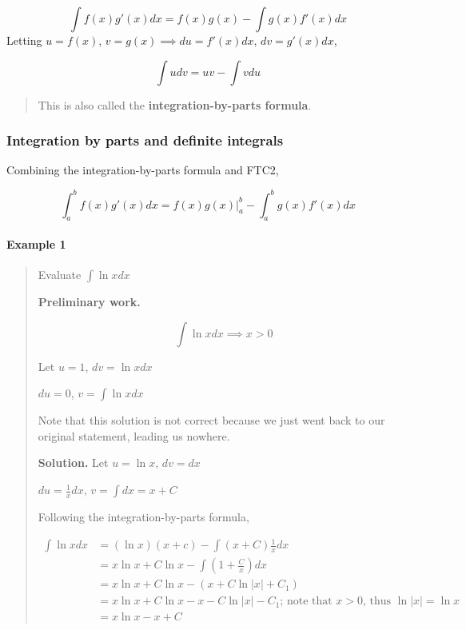 \documentclass[
]{article}
\begin{document}
\[ \int f(x)g'(x)dx = f(x)g(x) - \int g(x)f'(x)dx \] Letting
\(u = f(x)\), \(v=g(x) \implies du = f'(x)dx\), \(dv = g'(x)dx\),

\[ \int udv = uv - \int vdu \]

\begin{quote}
This is also called the \textbf{integration-by-parts formula}.
\end{quote}

\hypertarget{integration-by-parts-and-definite-integrals}{%
\subsubsection{Integration by parts and definite
integrals}\label{integration-by-parts-and-definite-integrals}}

Combining the integration-by-parts formula and FTC2,

\[ \int_a^b f(x)g'(x)dx = f(x)g(x) \Big|_a^b - \int_a^b g(x)f'(x)dx \]

\hypertarget{example-1-5}{%
\paragraph*{Example 1}\label{example-1-5}}

\begin{quote}
Evaluate \(\displaystyle\int \ln x dx\)

\textbf{Preliminary work.}

\[ \int \ln x dx \implies x > 0 \]

Let \(u = 1\), \(dv = \ln x dx\)

\(du = 0\), \(v = \int \ln x dx\)

Note that this solution is not correct because we just went back to our
original statement, leading us nowhere.

\textbf{Solution.} Let \(u = \ln x\), \(dv = dx\)

\(du = \frac{1}{x}dx\), \(v = \int dx = x + C\)

Following the integration-by-parts formula,

\begin{align*}
\int \ln x dx &= (\ln x)(x+c) - \int (x+C)\frac{1}{x} dx\\
&= x \ln x + C \ln x - \int (1+\frac{C}{x})dx\\
&= x \ln x + C \ln x - (x + C \ln |x| + C_1)\\
&= x \ln x + C \ln x - x - C \ln |x| - C_1\text{;  note that  }x > 0\text{, thus }\ln|x| = \ln x\\
&= x \ln x - x + C
\end{align*}
\end{quote}
\end{document}
